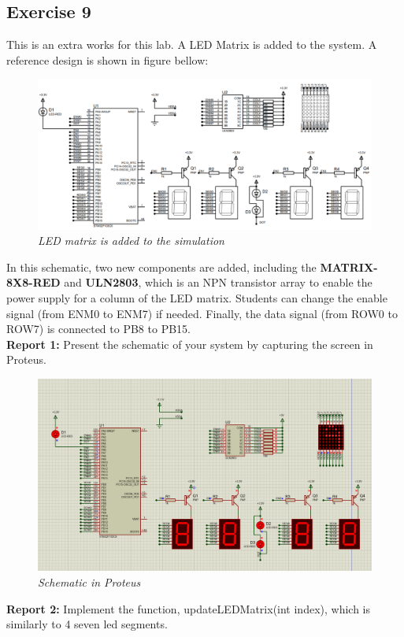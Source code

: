 \documentclass[twoside, final]{hcmut_report}
\begin{document}
\subsection{Exercise 9}

This is an extra works for this lab. A LED Matrix is added to the system. A reference design is shown in figure bellow:
\begin{figure}[!htp]
    \centering
    \includegraphics[width=5.5in]{graphics/lab2_m4.PNG}
    \caption{\textit{LED matrix is added to the simulation}}
    \label{bai2_pic9}
\end{figure}

In this schematic, two new components are added, including the \textbf{MATRIX-8X8-RED} and \textbf{ULN2803}, which is an NPN transistor array to enable the power supply for a column of the LED matrix. Students can change the enable signal (from ENM0 to  ENM7) if needed. Finally, the data signal (from ROW0 to ROW7) is connected to PB8 to PB15. \\

\textbf{Report 1: } Present the schematic of your system by capturing the screen in Proteus.\\

\begin{figure}[!htp]
	\centering
	\includegraphics[width=5.5in]{graphics/f1.png}
	\caption{\textit{Schematic in Proteus}}
\end{figure}
\textbf{Report 2: } Implement the function, updateLEDMatrix(int index), which is similarly  to 4 seven led segments.
\end{document}
